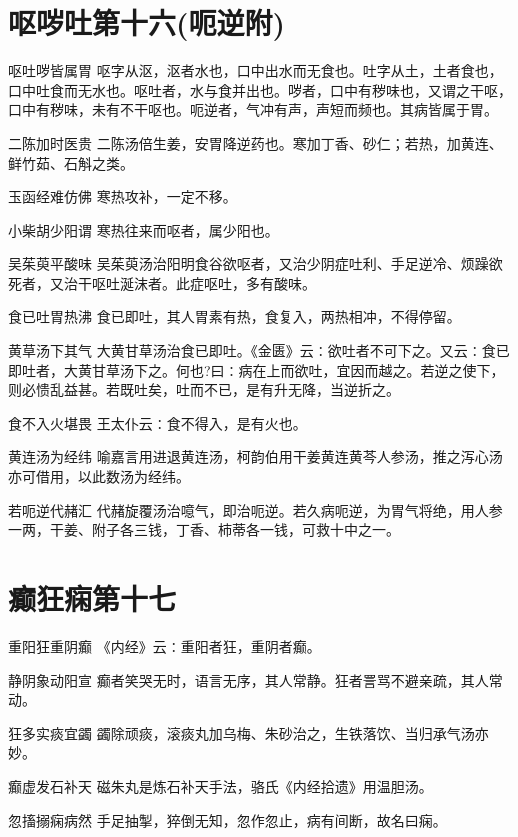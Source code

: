 \documentclass[a4paper,12pt,UTF8,twoside]{ctexbook}
\begin{document}
    \chapter{呕哕吐第十六(呃逆附)}
    呕吐哕皆属胃
    呕字从沤，沤者水也，口中出水而无食也。吐字从土，土者食也，口中吐食而无水也。呕吐者，水与食并出也。哕者，口中有秽味也，又谓之干呕，口中有秽味，未有不干呕也。呃逆者，气冲有声，声短而频也。其病皆属于胃。
    
    二陈加时医贵
    二陈汤倍生姜，安胃降逆药也。寒加丁香、砂仁；若热，加黄连、鲜竹茹、石斛之类。
    
    玉函经难仿佛
    寒热攻补，一定不移。
    
    小柴胡少阳谓
    寒热往来而呕者，属少阳也。
    
    吴茱萸平酸味
    吴茱萸汤治阳明食谷欲呕者，又治少阴症吐利、手足逆冷、烦躁欲死者，又治干呕吐涎沫者。此症呕吐，多有酸味。
    
    食已吐胃热沸
    食已即吐，其人胃素有热，食复入，两热相冲，不得停留。
    
    黄草汤下其气
    大黄甘草汤治食已即吐。《金匮》云∶欲吐者不可下之。又云∶食已即吐者，大黄甘草汤下之。何也?曰∶病在上而欲吐，宜因而越之。若逆之使下，则必愦乱益甚。若既吐矣，吐而不已，是有升无降，当逆折之。
    
    食不入火堪畏
    王太仆云∶食不得入，是有火也。
    
    黄连汤为经纬
    喻嘉言用进退黄连汤，柯韵伯用干姜黄连黄芩人参汤，推之泻心汤亦可借用，以此数汤为经纬。
    
    若呃逆代赭汇
    代赭旋覆汤治噫气，即治呃逆。若久病呃逆，为胃气将绝，用人参一两，干姜、附子各三钱，丁香、柿蒂各一钱，可救十中之一。
    
    
    
    \chapter{癫狂痫第十七}
        
    重阳狂重阴癫
    《内经》云∶重阳者狂，重阴者癫。
    
    静阴象动阳宣
    癫者笑哭无时，语言无序，其人常静。狂者詈骂不避亲疏，其人常动。
    
    狂多实痰宜蠲
    蠲除顽痰，滚痰丸加乌梅、朱砂治之，生铁落饮、当归承气汤亦妙。
    
    癫虚发石补天
    磁朱丸是炼石补天手法，骆氏《内经拾遗》用温胆汤。
    
    忽搐搦痫病然
    手足抽掣，猝倒无知，忽作忽止，病有间断，故名曰痫。
    
\end{document}
